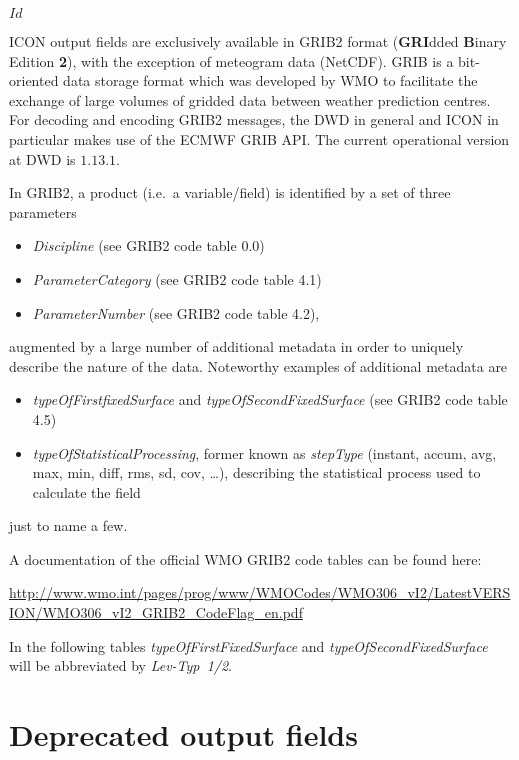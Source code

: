\svnInfo $Id$

ICON output fields are exclusively available in GRIB2 format (\textbf{GRI}dded \textbf{B}inary Edition \textbf{2}), with the exception of 
meteogram data (NetCDF). GRIB is a bit-oriented data storage format which was developed by \gls{WMO} to facilitate the exchange of large volumes of 
gridded data between weather prediction centres. For decoding and encoding GRIB2 messages, the DWD in general and ICON in particular 
makes use of the ECMWF GRIB API. The current operational version at DWD is $1.13.1$.
 
In GRIB2, a product (i.e.\ a variable/field) is identified by a set of three parameters
\begin{itemize}
 \item \emph{Discipline} (see GRIB2 code table 0.0)
 \item \emph{ParameterCategory} (see GRIB2 code table 4.1)
 \item \emph{ParameterNumber} (see GRIB2 code table 4.2), 
\end{itemize}
augmented by a large number of additional metadata in order to uniquely describe the nature of the data. Noteworthy examples 
of additional metadata are 
\begin{itemize}
  \item \emph{typeOfFirstfixedSurface} and \emph{typeOfSecondFixedSurface} (see GRIB2 code table 4.5)
  \item \emph{typeOfStatisticalProcessing}, former known as \emph{stepType} (instant, accum, avg, max, min, diff, rms, sd, cov, \dots),
        describing the statistical process used to calculate the field
 \end{itemize}
just to name a few.

A documentation of the official WMO GRIB2 code tables can be found here: 

\begin{minipage}{\textwidth}
\url{http://www.wmo.int/pages/prog/www/WMOCodes/WMO306_vI2/LatestVERSION/WMO306_vI2_GRIB2_CodeFlag_en.pdf}
\end{minipage}

In the following tables \emph{typeOfFirstFixedSurface} and \emph{typeOfSecondFixedSurface} will be abbreviated by \emph{Lev-Typ~1/2}.



\section{Deprecated output fields}

